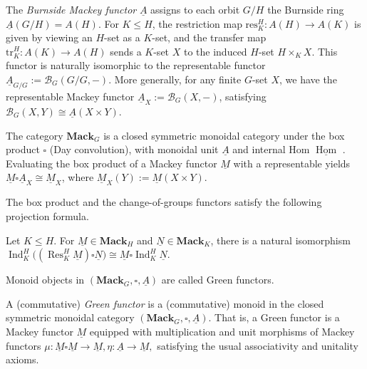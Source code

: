 \documentclass[11pt,oneside]{amsart}
\DeclareMathOperator{\Hom}{Hom}
\numberwithin{equation}{section}
\numberwithin{figure}{section}
\theoremstyle{plain}
\theoremstyle{definition}
\theoremstyle{remark}
\begin{document}
\begin{example}
    The \emph{Burnside Mackey functor} \(\underline{A}\) assigns to each orbit \(G/H\) the Burnside ring \(\underline{A}(G/H) = A(H)\). For \(K \le H\), the restriction map \(\mathrm{res}_K^H \colon A(H) \to A(K)\) is given by viewing an \(H\)-set as a \(K\)-set, and the transfer map \(\mathrm{tr}_K^H \colon A(K) \to A(H)\) sends a \(K\)-set \(X\) to the induced \(H\)-set \(H \times_K X\). This functor is naturally isomorphic to the representable functor \(\underline{A}_{G/G} := \mathcal{B}_G(G/G,-)\). More generally, for any finite \(G\)-set \(X\), we have the representable Mackey functor \(\underline{A}_X := \mathcal{B}_G(X,-)\), satisfying \(\mathcal{B}_G(X,Y) \cong \underline{A}(X\times Y)\). 
\end{example}


The category \(\mathbf{Mack}_G\) is a closed symmetric monoidal category under the box product \(\square\) (Day convolution), with monoidal unit \(\underline{A}\) and internal Hom \(\underline{\Hom}\) \cite[§2]{LEWMAN}. Evaluating the box product of a Mackey functor \(\underline{M}\) with a representable yields \( \underline{M}\square \underline{A}_X \cong \underline{M}_X \), where \(\underline{M}_X(Y) := \underline{M}(X\times Y)\).

The box product and the change-of-groups functors satisfy the following projection formula.

\begin{lemma}\label{lem:projection-formula-Mackey}
Let $K \leq H$. For $\underline{M} \in \mathbf{Mack}_H$ and $\underline{N} \in \mathbf{Mack}_K$, there is a natural isomorphism
\(
\operatorname{Ind}_K^H \bigl( (\operatorname{Res}_K^H \underline{M}) \square \underline{N} \bigr) \cong \underline{M} \square \operatorname{Ind}_K^H \underline{N}.
\)
\end{lemma}

 

 

Monoid objects in $(\mathbf{Mack}_G,\square,\underline A)$ are called Green functors.

 \begin{definition}
A (commutative) \emph{Green functor} is a (commutative) monoid
in the closed symmetric monoidal category $(\mathbf{Mack}_G,\square,\underline{A})$.
That is, a Green functor is a Mackey functor \(\underline M\) equipped with multiplication and unit morphisms of Mackey functors
\(
\mu:\underline{M}\square\underline{M}\to \underline{M},  \eta:\underline{A}\to \underline{M},
\)
satisfying the usual associativity and unitality axioms.
\end{definition}
\end{document}
